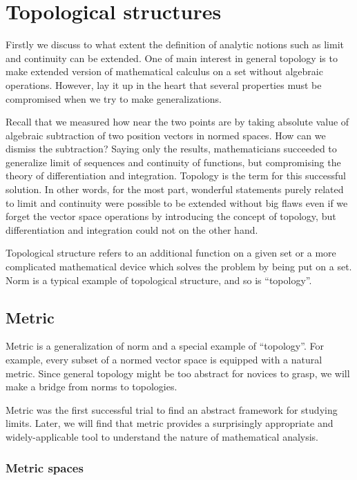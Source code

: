 \documentclass{../crs}
\begin{document}
\mainmatter


\chapter{Topological structures}

Firstly we discuss to what extent the definition of analytic notions such as limit and continuity can be extended.
One of main interest in general topology is to make extended version of mathematical calculus on a set without algebraic operations.
However, lay it up in the heart that several properties must be compromised when we try to make generalizations.

Recall that we measured how near the two points are by taking absolute value of algebraic subtraction of two position vectors in normed spaces.
How can we dismiss the subtraction?
Saying only the results, mathematicians succeeded to generalize limit of sequences and continuity of functions, but compromising the theory of differentiation and integration.
Topology is the term for this successful solution.
In other words, for the most part, wonderful statements purely related to limit and continuity were possible to be extended without big flaws even if we forget the vector space operations by introducing the concept of topology, but differentiation and integration could not on the other hand.
 
Topological structure refers to an additional function on a given set or a more complicated mathematical device which solves the problem by being put on a set.
Norm is a typical example of topological structure, and so is ``topology''.


\section{Metric}

Metric is a generalization of norm and a special example of ``topology''.
For example, every subset of a normed vector space is equipped with a natural metric.
Since general topology might be too abstract for novices to grasp, we will make a bridge from norms to topologies.

Metric was the first successful trial to find an abstract framework for studying limits.
Later, we will find that metric provides a surprisingly appropriate and widely-applicable tool to understand the nature of mathematical analysis.

\subsection{Metric spaces}
\end{document}

